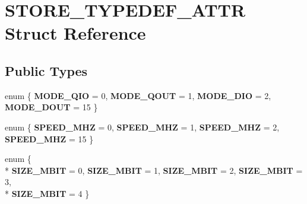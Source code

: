 \hypertarget{struct_s_t_o_r_e___t_y_p_e_d_e_f___a_t_t_r}{}\section{S\+T\+O\+R\+E\+\_\+\+T\+Y\+P\+E\+D\+E\+F\+\_\+\+A\+T\+T\+R Struct Reference}
\label{struct_s_t_o_r_e___t_y_p_e_d_e_f___a_t_t_r}
\subsection*{Public Types}
\begin{DoxyCompactItemize}
\item 
\hypertarget{struct_s_t_o_r_e___t_y_p_e_d_e_f___a_t_t_r_a78785f3b323604217b18de2dfeda2a51}{}enum \{ {\bfseries M\+O\+D\+E\+\_\+\+Q\+I\+O} = 0, 
{\bfseries M\+O\+D\+E\+\_\+\+Q\+O\+U\+T} = 1, 
{\bfseries M\+O\+D\+E\+\_\+\+D\+I\+O} = 2, 
{\bfseries M\+O\+D\+E\+\_\+\+D\+O\+U\+T} = 15
 \}\label{struct_s_t_o_r_e___t_y_p_e_d_e_f___a_t_t_r_a78785f3b323604217b18de2dfeda2a51}

\item 
\hypertarget{struct_s_t_o_r_e___t_y_p_e_d_e_f___a_t_t_r_a500a52952a5cc52a56faae2de585bb66}{}enum \{ {\bfseries S\+P\+E\+E\+D\+\_\+M\+H\+Z} = 0, 
{\bfseries S\+P\+E\+E\+D\+\_\+M\+H\+Z} = 1, 
{\bfseries S\+P\+E\+E\+D\+\_\+M\+H\+Z} = 2, 
{\bfseries S\+P\+E\+E\+D\+\_\+M\+H\+Z} = 15
 \}\label{struct_s_t_o_r_e___t_y_p_e_d_e_f___a_t_t_r_a500a52952a5cc52a56faae2de585bb66}

\item 
\hypertarget{struct_s_t_o_r_e___t_y_p_e_d_e_f___a_t_t_r_af04d6fca2bc0f363d944bd8a33f83f72}{}enum \{ \\*
{\bfseries S\+I\+Z\+E\+\_\+M\+B\+I\+T} = 0, 
{\bfseries S\+I\+Z\+E\+\_\+M\+B\+I\+T} = 1, 
{\bfseries S\+I\+Z\+E\+\_\+M\+B\+I\+T} = 2, 
{\bfseries S\+I\+Z\+E\+\_\+M\+B\+I\+T} = 3, 
\\*
{\bfseries S\+I\+Z\+E\+\_\+M\+B\+I\+T} = 4
 \}\label{struct_s_t_o_r_e___t_y_p_e_d_e_f___a_t_t_r_af04d6fca2bc0f363d944bd8a33f83f72}

\end{DoxyCompactItemize}
